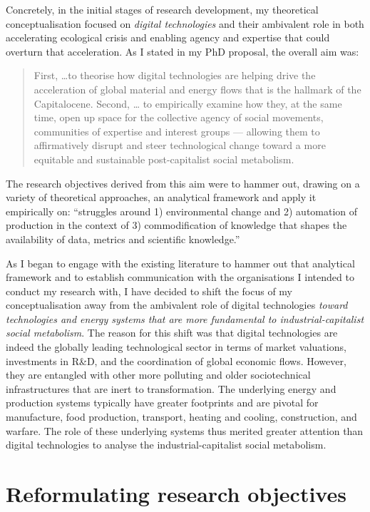 \documentclass[a4paper, nobind]{templates/ociamthesis}
\begin{document}
Concretely, in the initial stages of research development, my theoretical conceptualisation focused on \emph{digital technologies} and their ambivalent role in both accelerating ecological crisis and enabling agency and expertise that could overturn that acceleration. As I stated in my PhD proposal, the overall aim was:

\begin{quote}
First, \ldots to theorise how digital technologies are helping drive the acceleration of global material and energy flows that is the hallmark of the Capitalocene. Second, \ldots{} to empirically examine how they, at the same time, open up space for the collective agency of social movements, communities of expertise and interest groups --- allowing them to affirmatively disrupt and steer technological change toward a more equitable and sustainable post-capitalist social metabolism.
\end{quote}

The research objectives derived from this aim were to hammer out, drawing on a variety of theoretical approaches, an analytical framework and apply it empirically on: ``struggles around 1) environmental change and 2) automation of production in the context of 3) commodification of knowledge that shapes the availability of data, metrics and scientific knowledge.''

As I began to engage with the existing literature to hammer out that analytical framework and to establish communication with the organisations I intended to conduct my research with, I have decided to shift the focus of my conceptualisation away from the ambivalent role of digital technologies \emph{toward technologies and energy systems that are more fundamental to industrial-capitalist social metabolism}. The reason for this shift was that digital technologies are indeed the globally leading technological sector in terms of market valuations, investments in R\&D, and the coordination of global economic flows. However, they are entangled with other more polluting and older sociotechnical infrastructures that are inert to transformation. The underlying energy and production systems typically have greater footprints and are pivotal for manufacture, food production, transport, heating and cooling, construction, and warfare. The role of these underlying systems thus merited greater attention than digital technologies to analyse the industrial-capitalist social metabolism.

\hypertarget{reformulating-research-objectives}{%
\section{Reformulating research objectives}\label{reformulating-research-objectives}}
\end{document}
